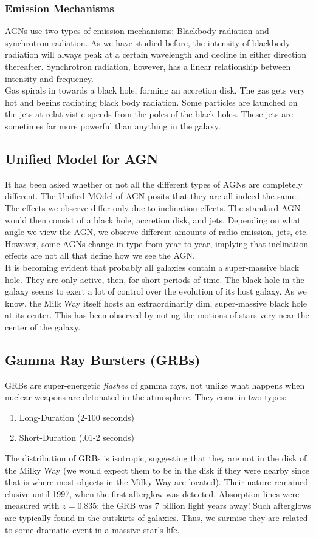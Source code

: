 \documentclass{article}
\begin{document}
	\subsubsection{Emission Mechanisms}
	AGNs use two types of emission mechanisms: Blackbody radiation and synchrotron radiation. As we have studied before, the intensity of blackbody radiation will always peak at a certain wavelength and decline in either direction thereafter. Synchrotron radiation, however, has a linear relationship between intensity and frequency.\\
	
	\noindent Gas spirals in towards a black hole, forming an accretion disk. The gas gets very hot and begins radiating black body radiation. Some particles are launched on the jets at relativistic speeds from the poles of the black holes. These jets are sometimes far more powerful than anything in the galaxy.
	\subsection{Unified Model for AGN}
	It has been asked whether or not all the different types of AGNs are completely different. The Unified MOdel of AGN posits that they are all indeed the same. The effects we observe differ only due to inclination effects. The standard AGN would then consist of a black hole, accretion disk, and jets. Depending on what angle we view the AGN, we observe different amounts of radio emission, jets, etc. However, some AGNs change in type from year to year, implying that inclination effects are not all that define how we see the AGN.\\
	
	\noindent It is becoming evident that probably all galaxies contain a super-massive black hole. They are only active, then, for short periods of time. The black hole in the galaxy seems to exert a lot of control over the evolution of its host galaxy. As we know, the Milk Way itself hosts an extraordinarily dim, super-massive black hole at its center. This has been observed by noting the motions of stars very near the center of the galaxy.
	\subsection{Gamma Ray Bursters (GRBs)}
	GRBs are super-energetic \emph{flashes} of gamma rays, not unlike what happens when nuclear weapons are detonated in the atmosphere. They come in two types:
	\begin{enumerate}
		\item Long-Duration (2-100 seconds)
		\item Short-Duration (.01-2 seconds)
	\end{enumerate}
	The distribution of GRBs is isotropic, suggesting that they are not in the disk of the Milky Way (we would expect them to be in the disk if they were nearby since that is where most objects in the Milky Way are located). Their nature remained elusive until 1997, when the first afterglow was detected. Absorption lines were measured with $z=0.835$: the GRB was 7 billion light years away! Such afterglows are typically found in the outskirts of galaxies. Thus, we surmise they are related to some dramatic event in a massive star's life.
\end{document}
